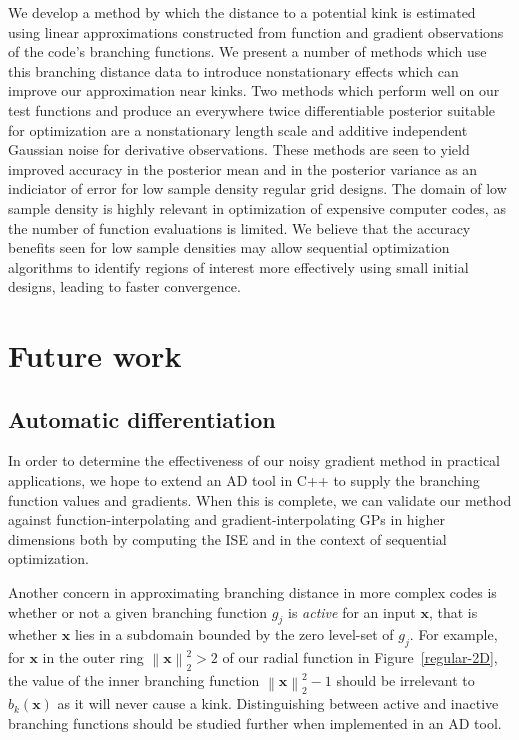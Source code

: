 \documentclass{article}
\newcommand{\norm}[1]{\left\lVert#1\right\rVert}
\renewcommand{\vec}[1]{\mathbf{#1}}
\begin{document}
We develop a method by which the distance to a potential kink is estimated using linear approximations constructed from function and gradient observations of the code's branching functions. We present a number of methods which use this branching distance data to introduce nonstationary effects which can improve our approximation near kinks. Two methods which perform well on our test functions and produce an everywhere twice differentiable posterior suitable for optimization are a nonstationary length scale and additive independent Gaussian noise for derivative observations. These methods are seen to yield improved accuracy in the posterior mean and in the posterior variance as an indiciator of error for low sample density regular grid designs. The domain of low sample density is highly relevant in optimization of expensive computer codes, as the number of function evaluations is limited. We believe that the accuracy benefits seen for low sample densities may allow sequential optimization algorithms to identify regions of interest more effectively using small initial designs, leading to faster convergence.

\section{Future work} \label{future-work}
\subsection{Automatic differentiation}
In order to determine the effectiveness of our noisy gradient method in practical applications, we hope to extend an AD tool in C++ to supply the branching function values and gradients. When this is complete, we can validate our method against function-interpolating and gradient-interpolating GPs in higher dimensions both by computing the ISE and in the context of sequential optimization.

Another concern in approximating branching distance in more complex codes is whether or not a given branching function $g_j$ is \textit{active} for an input $\vec{x}$, that is whether $\vec{x}$ lies in a subdomain bounded by the zero level-set of $g_j$. For example, for $\vec{x}$ in the outer ring $\norm{\vec{x}}_2^2 > 2$ of our radial function in Figure~\ref{regular-2D}, the value of the inner branching function $\norm{\vec{x}}_2^2 - 1$ should be irrelevant to $\hat{b}_k(\vec{x})$
as it will never cause a kink. Distinguishing between active and inactive branching functions should be studied further when implemented in an AD tool.
\end{document}
